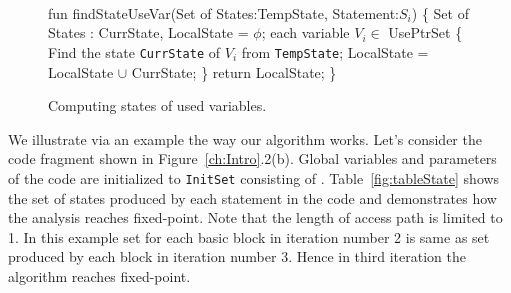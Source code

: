 \begin{figure}
\begin{framed}
{\tt
  \begin{program}{0}
  \FL fun findStateUseVar(Set of States:TempState, Statement:$S_i$)  \{
   Set of States : CurrState, LocalState = $\phi$;
   \FOR each variable $V_i\in$ UsePtrSet \{
   Find the state {\tt CurrState} of $V_i$ from {\tt TempState};
   LocalState = LocalState $\cup$ CurrState;
   \}
   return LocalState;
   \}
  \end{program}
}
\end{framed}
  \caption{Computing states of used variables. \label{fig:AlgoFindStateUseVar}}
\end{figure}
\begin{example}{\rm
We illustrate via an example the way our algorithm works. Let's consider the code fragment shown in Figure~\ref{ch:Intro}.2(b). 
Global variables and parameters of the code are initialized to {\tt InitSet} consisting of . Table~\ref{fig:tableState} 
shows the set of states produced by each statement in the code and demonstrates how the analysis reaches fixed-point. 
Note that the length of access path is limited to 1. In this example  set for each basic block in iteration number 2 is same as  set produced by each block in iteration number 3. Hence in third iteration the algorithm reaches fixed-point.
}
\hfill\psframebox{}  \end{example}

